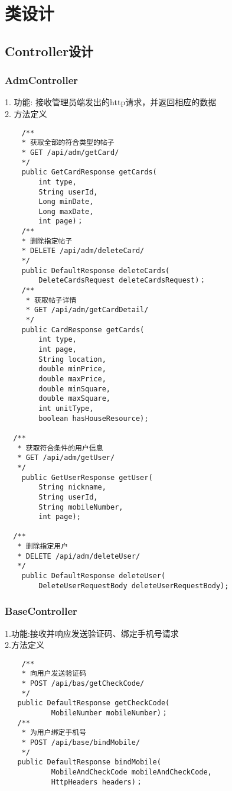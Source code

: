 \chapter{类设计}

\section{Controller设计}

\subsection{AdmController}

1. 功能: 接收管理员端发出的http请求，并返回相应的数据 \\
2. 方法定义
\begin{lstlisting}
    /**
    * 获取全部的符合类型的帖子
    * GET /api/adm/getCard/
    */
    public GetCardResponse getCards(
        int type, 
        String userId, 
        Long minDate,
        Long maxDate, 
        int page)；
    /**
    * 删除指定帖子
    * DELETE /api/adm/deleteCard/
    */
    public DefaultResponse deleteCards(
        DeleteCardsRequest deleteCardsRequest)；
    /**
     * 获取帖子详情
     * GET /api/adm/getCardDetail/
     */
    public CardResponse getCards(
        int type,
        int page,
        String location,
        double minPrice,
        double maxPrice,
        double minSquare,
        double maxSquare,
        int unitType,
        boolean hasHouseResource);

  /**
   * 获取符合条件的用户信息
   * GET /api/adm/getUser/
   */
    public GetUserResponse getUser(
        String nickname,
        String userId,
        String mobileNumber,
        int page);

  /**
   * 删除指定用户
   * DELETE /api/adm/deleteUser/
   */    
    public DefaultResponse deleteUser(
        DeleteUserRequestBody deleteUserRequestBody);
    \end{lstlisting}



\subsection{BaseController}
1.功能:接收并响应发送验证码、绑定手机号请求 \\
2.方法定义
\begin{lstlisting}
    /**
    * 向用户发送验证码
    * POST /api/bas/getCheckCode/
    */
   public DefaultResponse getCheckCode(
           MobileNumber mobileNumber)；
   /**
    * 为用户绑定手机号
    * POST /api/base/bindMobile/
    */
   public DefaultResponse bindMobile(
           MobileAndCheckCode mobileAndCheckCode,
           HttpHeaders headers)；
\end{lstlisting}

